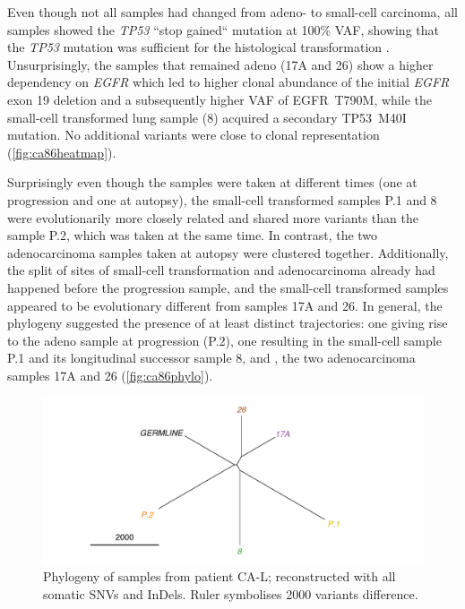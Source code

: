 Even though not all samples had changed from adeno- to small-cell carcinoma, all samples showed the \textit{TP53} ``stop gained`` mutation at 100\% VAF, showing that the  \textit{TP53} mutation was sufficient for the histological transformation \cite{Offin2019}. Unsurprisingly, the samples that remained adeno (17A and 26) show a higher dependency on \textit{EGFR} which led to  higher clonal abundance of the initial \textit{EGFR} exon 19 deletion and a subsequently higher VAF of EGFR~T790M, while the small-cell transformed lung sample (8) acquired a secondary TP53~M40I mutation. No additional variants were close to clonal representation (\autoref{fig:ca86heatmap}).

Surprisingly even though the samples were taken at different times (one at progression and one at autopsy), the small-cell transformed samples P.1 and 8 were evolutionarily more closely related and shared more variants than  the sample P.2, which was taken at the same time. In contrast, the two adenocarcinoma samples taken at autopsy were clustered together. Additionally, the split of sites of small-cell transformation and adenocarcinoma  already had happened before the progression sample, and the small-cell transformed samples appeared to be evolutionary different from samples 17A and 26. In general, the phylogeny suggested the presence of at least  distinct trajectories: one giving rise to the adeno sample at progression (P.2), one resulting in the small-cell sample P.1 and its longitudinal successor sample 8, and , the two adenocarcinoma samples 17A and 26 (\autoref{fig:ca86phylo}).

\begin{figure}[ht]
	\centering
	\includegraphics[width=.99\linewidth]{Figures/CASCADE/CA86/CA86phylo.pdf}
	\caption[Phylogeny of autopsy samples from patient CA-L]{Phylogeny of samples from patient CA-L; reconstructed with all somatic SNVs and InDels. Ruler symbolises 2000 variants difference.} \label{fig:ca86phylo}
\end{figure}



